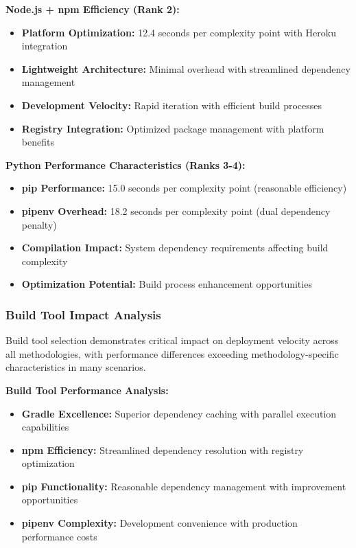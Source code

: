 \textbf{Node.js + npm Efficiency (Rank 2):}
\begin{itemize}
\item \textbf{Platform Optimization:} 12.4 seconds per complexity point with Heroku integration
\item \textbf{Lightweight Architecture:} Minimal overhead with streamlined dependency management
\item \textbf{Development Velocity:} Rapid iteration with efficient build processes
\item \textbf{Registry Integration:} Optimized package management with platform benefits
\end{itemize}

\textbf{Python Performance Characteristics (Ranks 3-4):}
\begin{itemize}
\item \textbf{pip Performance:} 15.0 seconds per complexity point (reasonable efficiency)
\item \textbf{pipenv Overhead:} 18.2 seconds per complexity point (dual dependency penalty)
\item \textbf{Compilation Impact:} System dependency requirements affecting build complexity
\item \textbf{Optimization Potential:} Build process enhancement opportunities
\end{itemize}

\subsubsection{Build Tool Impact Analysis}

Build tool selection demonstrates critical impact on deployment velocity across all methodologies, with performance differences exceeding methodology-specific characteristics in many scenarios.

\textbf{Build Tool Performance Analysis:}
\begin{itemize}
\item \textbf{Gradle Excellence:} Superior dependency caching with parallel execution capabilities
\item \textbf{npm Efficiency:} Streamlined dependency resolution with registry optimization
\item \textbf{pip Functionality:} Reasonable dependency management with improvement opportunities
\item \textbf{pipenv Complexity:} Development convenience with production performance costs
\end{itemize}

